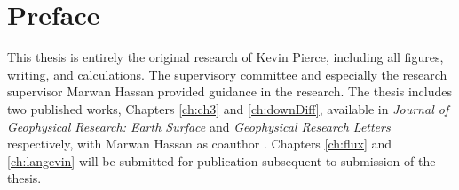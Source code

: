 
\chapter{Preface}

This thesis is entirely the original research of Kevin Pierce, including all figures, writing, and calculations.
The supervisory committee and especially the research supervisor Marwan Hassan provided guidance in the research.
The thesis includes two published works, Chapters \ref{ch:ch3} and \ref{ch:downDiff}, available in \textit{Journal of Geophysical Research: Earth Surface} and \textit{Geophysical Research Letters} respectively, with Marwan Hassan as coauthor \citep{Pierce2020a,Pierce2020b}. Chapters \ref{ch:flux} and \ref{ch:langevin} will be submitted for publication subsequent to submission of the thesis.